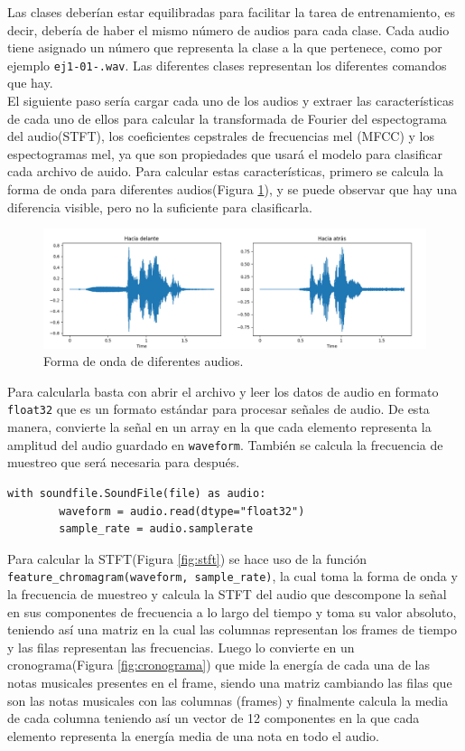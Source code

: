 Las clases deberían estar equilibradas para facilitar la tarea de entrenamiento, es decir, debería de haber el mismo número de audios para cada clase. Cada audio tiene asignado un número que representa la clase a la que pertenece, como por ejemplo \texttt{ej1-01-.wav}. Las diferentes clases representan los diferentes comandos que hay.\\


 El siguiente paso sería cargar cada uno de los audios y extraer las características de cada uno de ellos para calcular la transformada de Fourier del espectograma del audio(STFT), los coeficientes cepstrales de frecuencias mel (MFCC) y los espectogramas mel, ya que son propiedades que usará el modelo para clasificar cada archivo de auido. Para calcular estas características, primero se calcula la forma de onda para diferentes audios(Figura \ref{fig:onda}), y se puede observar que hay una diferencia visible, pero no la suficiente para clasificarla.
 
 \begin{figure}[H]
  \centering
  \includegraphics[scale=0.3]{figs/forma_onda} %
  \caption{ Forma de onda de diferentes audios.}
  \label{fig:onda}
\end{figure}



Para calcularla basta con abrir el archivo y leer los datos de audio en formato \texttt{float32} que es un formato estándar para procesar señales de audio. De esta manera, convierte la señal en un array en la que cada elemento representa la amplitud del audio guardado en \texttt{waveform}. También se calcula la frecuencia de muestreo que será necesaria para después.

\begin{verbatim}
with soundfile.SoundFile(file) as audio:
        waveform = audio.read(dtype="float32")
        sample_rate = audio.samplerate
\end{verbatim}

Para calcular la STFT(Figura \ref{fig:stft}) se hace uso de la función \verb|feature_chromagram(waveform, sample_rate)|, la cual toma la forma de onda y la frecuencia de muestreo y calcula la STFT del audio que descompone la señal en sus componentes de frecuencia a lo largo del tiempo y toma su valor absoluto, teniendo así una matriz en la cual las columnas representan los frames de tiempo y las filas representan las frecuencias. Luego lo convierte en un cronograma(Figura \ref{fig:cronograma}) que mide la energía de cada una de las notas musicales presentes en el frame, siendo una matriz cambiando las filas que son las notas musicales con las columnas (frames) y finalmente calcula la media de cada columna teniendo así un vector de 12 componentes en la que cada elemento representa la energía media de una nota en todo el audio.



